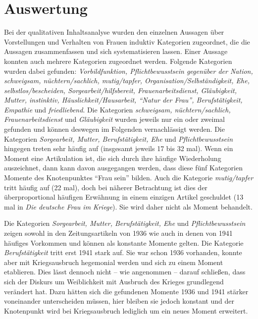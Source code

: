 \documentclass[12pt, titlepage=true, toc=bib]{scrartcl}
\begin{document}
\section{Auswertung}

Bei der qualitativen Inhaltsanalyse wurden den einzelnen Aussagen über Vorstellungen und Verhalten von Frauen induktiv Kategorien zugeordnet, die die Aussagen zusammenfassen und sich systematisieren lassen. Einer Aussage konnten auch mehrere Kategorien zugeordnet werden. Folgende Kategorien wurden dabei gefunden: \textit{Vorbildfunktion, Pflichtbewusstsein gegenüber der Nation, schweigsam, nüchtern/sachlich, mutig/tapfer, Organisation/Selbständigkeit, Ehe, selbstlos/bescheiden, Sorgearbeit/hilfsbereit, Frauenarbeitsdienst, Gläubigkeit, Mutter, instinktiv, Häuslichkeit/Hausarbeit, "`Natur der Frau"', Berufstätigkeit, Empathie} und \textit{friedliebend}. Die Kategorien \textit{schweigsam, nüchtern/sachlich, Frauenarbeitsdienst} und \textit{Gläubigkeit} wurden jeweils nur ein oder zweimal gefunden und können deswegen im Folgenden vernachlässigt werden. Die Kategorien \textit{Sorgearbeit, Mutter, Berufstätigkeit, Ehe} und \textit{Pflichtbewusstsein} hingegen treten sehr häufig auf (insgesamt jeweils 17 bis 32 mal). Wenn ein Moment eine Artikulation ist, die sich durch ihre häufige Wiederholung auszeichnet, dann kann davon ausgegangen werden, dass diese fünf Kategorien Momente des Knotenpunktes "`Frau sein"' bilden. Auch die Kategorie \textit{mutig/tapfer} tritt häufig auf (22 mal), doch bei näherer Betrachtung ist dies der überproportional häufigen Erwähnung in einem einzigen Artikel geschuldet (13 mal in \textit{Die deutsche Frau im Kriege}). Sie wird daher nicht als Moment behandelt. 
 
Die Kategorien \textit{Sorgearbeit, Mutter, Berufstätigkeit, Ehe} und \textit{Pflichtbewusstsein} zeigen sowohl in den Zeitungsartikeln von 1936 wie auch in denen von 1941 häufiges Vorkommen und können als konstante Momente gelten. Die Kategorie \textit{Berufstätigkeit} tritt erst 1941 stark auf. Sie war schon 1936 vorhanden, konnte aber mit Kriegsausbruch hegemonial werden und sich zu einem Moment etablieren. Dies lässt dennoch nicht -- wie angenommen -- darauf schließen, dass sich der Diskurs um Weiblichkeit mit Ausbruch des Krieges grundlegend verändert hat. Dazu hätten sich die gefundenen Momente 1936 und 1941 stärker voneinander unterscheiden müssen, hier bleiben sie jedoch konstant und der Knotenpunkt wird bei Kriegsausbruch lediglich um ein neues Moment erweitert.
\end{document}
